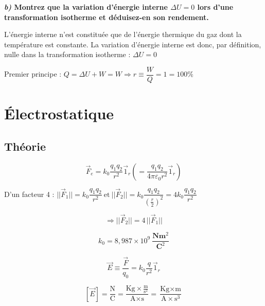 \documentclass	[11pt, a4paper, openany]{book}
\begin{document}
	\textbf{\textit{b)} Montrez que la variation d'énergie interne $\Delta U = 0$ lors d'une transformation isotherme et déduisez-en son rendement.}
		
		L'énergie interne n'est constituée que de l'énergie thermique du gaz dont la température est constante. La variation d'énergie interne est donc, par définition, nulle dans la transformation isotherme : $\Delta U = 0$
		
		Premier principe : $Q = \Delta U + W = W \Rightarrow r \equiv \dfrac{W}{Q} = 1 = 100\% $
		

\newpage
\section{Électrostatique}
	\subsection{Théorie}
	
	$$ \vec F_e = k_0 \dfrac{q_1 q_2}{r^2} \vec 1_r \left(= \dfrac{q_1 q_2}{4\pi \varepsilon_0 r^2} \vec 1_r \right) $$
	
	
	D'un facteur 4 : $ ||\vec F_1|| = k_0 \dfrac{q_1 q_2}{r^2}\ \text{et}\ ||\vec F_2|| = k_0 \dfrac{q_1 q_2}{(\frac{r}{2})^2} = 4 k_0 \dfrac{q_1 q_2}{r^2}$
	
	$$\Rightarrow ||\vec F_2|| = 4\,||\vec F_1||$$
	
	
	$$ k_0 = 8,987 \times 10^9\ \frac{\textbf{N} \textbf{m}^2}{\textbf{C}^2} $$
	
	
	$$ \vec E \equiv \dfrac{\vec F}{q_0} = k_0 \dfrac{q}{r^2} \vec 1_r $$
	
	
	$$ [\vec E ] = \dfrac{\text{N}}{\text{C}} = \dfrac{\text{Kg}\times \frac{\text{m}}{\text{s}^2}}{\text{A} \times \text{s}} = \dfrac{\text{Kg}\times \text{m}}{\text{A} \times \text{s}^3} $$
	
\end{document}
